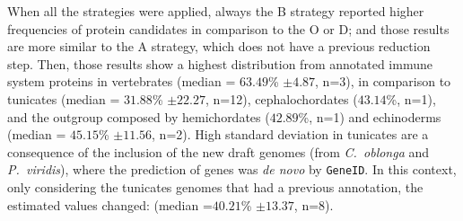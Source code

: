 \documentclass[11pt]{article}
\begin{document}
When all the strategies were applied, always the B strategy reported higher 
frequencies of protein candidates in comparison to the O or D; and those 
results are more similar to the A strategy, which does not have a previous 
reduction step. Then, those results show a highest distribution from 
annotated immune system proteins in vertebrates  (median = $63.49$\% $\pm 
4.87$, n=3), in comparison to tunicates (median = $31.88$\% $\pm 22.27$, n=12), 
cephalochordates ($43.14$\%, n=1), and the outgroup composed by hemichordates 
($42.89$\%, n=1) and echinoderms (median = $45.15$\% $\pm 11.56$, n=2). High 
standard deviation in tunicates are a consequence of the inclusion of the new 
draft genomes (from \textit{C.\ oblonga} and \textit{P.\ viridis}), where the 
prediction of genes was \textsl{de novo} by \texttt{GeneID}. In this context, 
only considering the tunicates genomes that had a previous annotation, the 
estimated values changed: (median =$40.21$\% $\pm 13.37$, n=8).
\end{document}
